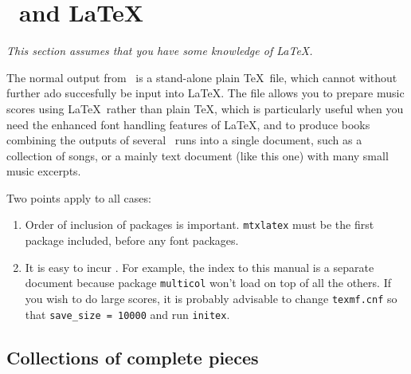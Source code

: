 \documentclass[11pt]{article}
\begin{document}

\pagebreak



\hskip -20mm
\begin{mus}
 
\end{mus}

\pagebreak

\section{\MTx\ and \LaTeX}  

\textit{This section assumes that you have some knowledge of 
\LaTeX.}

The normal output from \PMX\ is a stand-alone plain \TeX\ file, which 
cannot without further ado succesfully be input into \LaTeX.  
The file  allows you to prepare music scores using
\LaTeX\ rather than plain \TeX, which is particularly useful when you 
need the enhanced font handling features of \LaTeX, and to produce
books combining the outputs of several \PMX\ runs into a single
document, such as a collection of songs, or a mainly text document
 (like this one) with many small music excerpts.

Two points apply to all cases:
\begin{enumerate} 
  \item Order of inclusion of packages is important.  \texttt{mtxlatex}
    must be the first package included, before any font packages.
  \item It is easy to incur .  For
example, the index to this manual is a separate document because
package \texttt{multicol} won't load on top of all the others.
If you wish to do large scores, it is probably advisable to change 
\texttt{texmf.cnf} so that \verb"save_size = 10000" and run
\texttt{initex}.
\end{enumerate}

\subsection{Collections of complete pieces}
\end{document}
